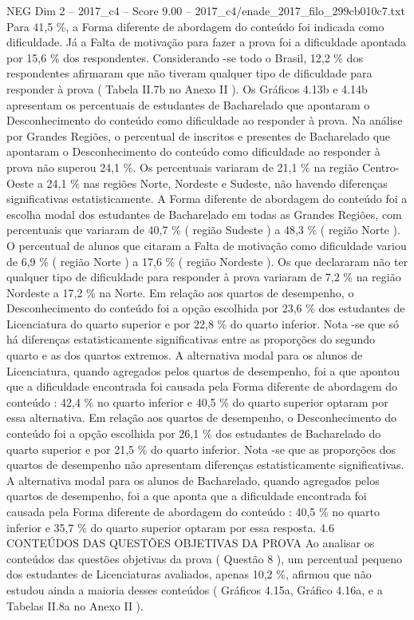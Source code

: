 \begin{textsample}{NEG Dim 2 – 2017\_c4 – Score 9.00 – 2017\_c4/enade\_2017\_filo\_299cb010c7.txt}
Para 41,5 \%, a Forma diferente de abordagem do conteúdo foi indicada como dificuldade.
Já a Falta de motivação para fazer a prova foi a dificuldade apontada por 15,6 \% dos respondentes.
Considerando -se todo o Brasil, 12,2 \% dos respondentes afirmaram que não tiveram qualquer tipo de dificuldade para responder à prova ( Tabela II.7b no Anexo II ).
Os Gráficos 4.13b e 4.14b apresentam os percentuais de estudantes de Bacharelado que apontaram o Desconhecimento do conteúdo como dificuldade ao responder à prova.
Na análise por Grandes Regiões, o percentual de inscritos e presentes de Bacharelado que apontaram o Desconhecimento do conteúdo como dificuldade ao responder à prova não superou 24,1 \%.
Os percentuais variaram de 21,1 \% na região Centro-Oeste a 24,1 \% nas regiões Norte, Nordeste e Sudeste, não havendo diferenças significativas estatisticamente.
A Forma diferente de abordagem do conteúdo foi a escolha modal dos estudantes de Bacharelado em todas as Grandes Regiões, com percentuais que variaram de 40,7 \% ( região Sudeste ) a 48,3 \% ( região Norte ).
O percentual de alunos que citaram a Falta de motivação como dificuldade variou de 6,9 \% ( região Norte ) a 17,6 \% ( região Nordeste ).
Os que declararam não ter qualquer tipo de dificuldade para responder à prova variaram de 7,2 \% na região Nordeste a 17,2 \% na Norte.
Em relação aos quartos de desempenho, o Desconhecimento do conteúdo foi a opção escolhida por 23,6 \% dos estudantes de Licenciatura do quarto superior e por 22,8 \% do quarto inferior.
Nota -se que só há diferenças estatisticamente significativas entre as proporções do segundo quarto e as dos quartos extremos.
A alternativa modal para os alunos de Licenciatura, quando agregados pelos quartos de desempenho, foi a que apontou que a dificuldade encontrada foi causada pela Forma diferente de abordagem do conteúdo : 42,4 \% no quarto inferior e 40,5 \% do quarto superior optaram por essa alternativa.
Em relação aos quartos de desempenho, o Desconhecimento do conteúdo foi a opção escolhida por 26,1 \% dos estudantes de Bacharelado do quarto superior e por 21,5 \% do quarto inferior.
Nota -se que as proporções dos quartos de desempenho não apresentam diferenças estatisticamente significativas.
A alternativa modal para os alunos de Bacharelado, quando agregados pelos quartos de desempenho, foi a que aponta que a dificuldade encontrada foi causada pela Forma diferente de abordagem do conteúdo : 40,5 \% no quarto inferior e 35,7 \% do quarto superior optaram por essa resposta. 4.6 CONTEÚDOS DAS QUESTÕES OBJETIVAS DA PROVA Ao analisar os conteúdos das questões objetivas da prova ( Questão 8 ), um percentual pequeno dos estudantes de Licenciaturas avaliados, apenas 10,2 \%, afirmou que não estudou ainda a maioria desses conteúdos ( Gráficos 4.15a, Gráfico 4.16a, e a Tabelas II.8a no Anexo II ).

\end{textsample}
